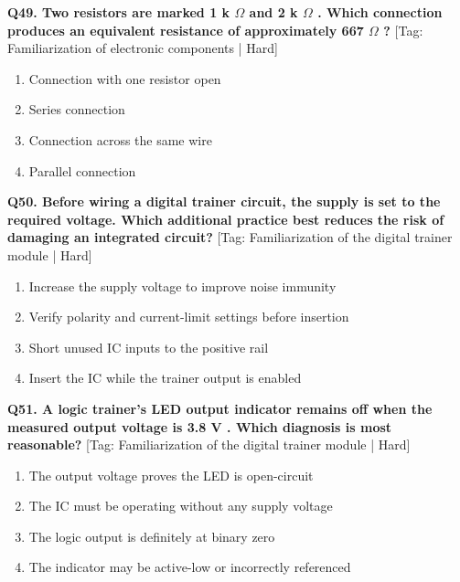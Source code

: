 \noindent\textbf{Q49. Two resistors are marked 1 k $\Omega$ and 2 k $\Omega$ . Which connection produces an equivalent resistance of approximately 667 $\Omega$ ?} \hfill [Tag: Familiarization of electronic components | Hard]
\begin{enumerate}[label=(\alph*),topsep=2pt,itemsep=1pt,partopsep=0pt,parsep=0pt]
    \item {Connection with one resistor open}
    \item {Series connection}
    \item {Connection across the same wire}
    \item {Parallel connection}
\end{enumerate}
\vspace{2mm}

\noindent\textbf{Q50. Before wiring a digital trainer circuit, the supply is set to the required voltage. Which additional practice best reduces the risk of damaging an integrated circuit?} \hfill [Tag: Familiarization of the digital trainer module | Hard]
\begin{enumerate}[label=(\alph*),topsep=2pt,itemsep=1pt,partopsep=0pt,parsep=0pt]
    \item {Increase the supply voltage to improve noise immunity}
    \item {Verify polarity and current-limit settings before insertion}
    \item {Short unused IC inputs to the positive rail}
    \item {Insert the IC while the trainer output is enabled}
\end{enumerate}
\vspace{2mm}

\noindent\textbf{Q51. A logic trainer's LED output indicator remains off when the measured output voltage is 3.8 V . Which diagnosis is most reasonable?} \hfill [Tag: Familiarization of the digital trainer module | Hard]
\begin{enumerate}[label=(\alph*),topsep=2pt,itemsep=1pt,partopsep=0pt,parsep=0pt]
    \item {The output voltage proves the LED is open-circuit}
    \item {The IC must be operating without any supply voltage}
    \item {The logic output is definitely at binary zero}
    \item {The indicator may be active-low or incorrectly referenced}
\end{enumerate}
\vspace{2mm}

